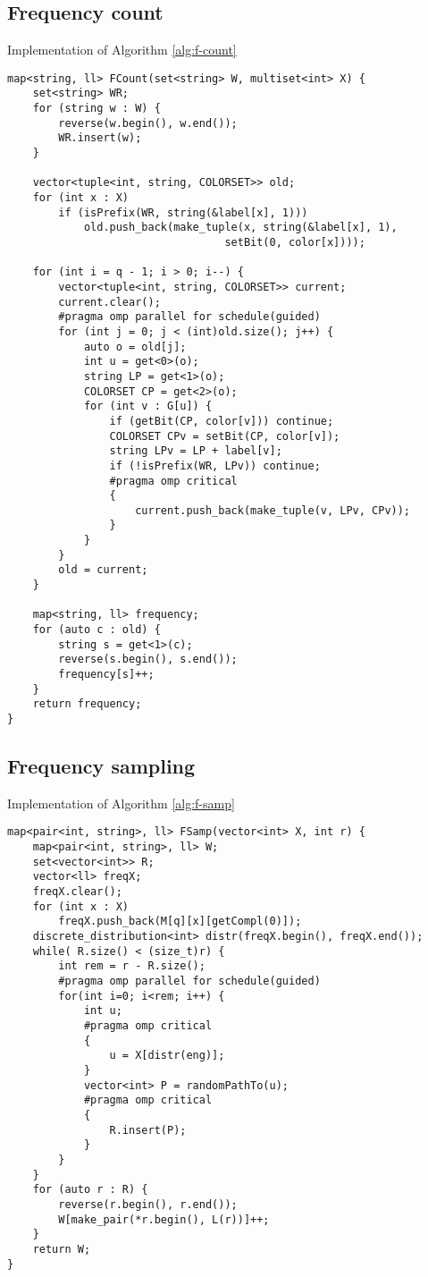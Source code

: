 \subsection*{Frequency count}

Implementation of Algorithm \ref{alg:f-count}

\begin{lstlisting}
map<string, ll> FCount(set<string> W, multiset<int> X) {
	set<string> WR;
	for (string w : W) {
		reverse(w.begin(), w.end());
		WR.insert(w);
	}
	
	vector<tuple<int, string, COLORSET>> old;
	for (int x : X)
		if (isPrefix(WR, string(&label[x], 1)))
			old.push_back(make_tuple(x, string(&label[x], 1),
                                  setBit(0, color[x])));
	
	for (int i = q - 1; i > 0; i--) {
		vector<tuple<int, string, COLORSET>> current;
		current.clear();
		#pragma omp parallel for schedule(guided)
		for (int j = 0; j < (int)old.size(); j++) {
			auto o = old[j];
			int u = get<0>(o);
			string LP = get<1>(o);
			COLORSET CP = get<2>(o);
			for (int v : G[u]) {
				if (getBit(CP, color[v])) continue;
				COLORSET CPv = setBit(CP, color[v]);
				string LPv = LP + label[v];
				if (!isPrefix(WR, LPv)) continue;
				#pragma omp critical
				{ 
					current.push_back(make_tuple(v, LPv, CPv)); 
				}
			}
		}
		old = current;
	}
	
	map<string, ll> frequency;
	for (auto c : old) {
		string s = get<1>(c);
		reverse(s.begin(), s.end());
		frequency[s]++;
	}
	return frequency;
}
\end{lstlisting}

\clearpage
\subsection*{Frequency sampling}

Implementation of Algorithm \ref{alg:f-samp}

\begin{lstlisting}
map<pair<int, string>, ll> FSamp(vector<int> X, int r) {
	map<pair<int, string>, ll> W;
	set<vector<int>> R;
	vector<ll> freqX;
	freqX.clear();
	for (int x : X) 
		freqX.push_back(M[q][x][getCompl(0)]);
	discrete_distribution<int> distr(freqX.begin(), freqX.end());
	while( R.size() < (size_t)r) {
		int rem = r - R.size();
		#pragma omp parallel for schedule(guided)
		for(int i=0; i<rem; i++) {
			int u;
			#pragma omp critical
			{
				u = X[distr(eng)];
			}
			vector<int> P = randomPathTo(u);
			#pragma omp critical
			{
				R.insert(P);
			}
		}
	}
	for (auto r : R) {
		reverse(r.begin(), r.end());
		W[make_pair(*r.begin(), L(r))]++;
	}
	return W;
}
\end{lstlisting}

